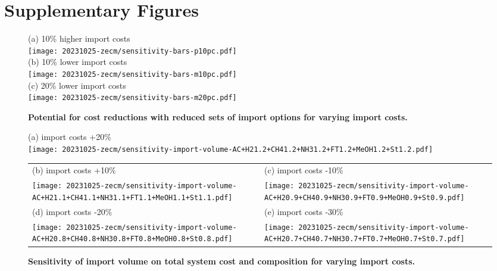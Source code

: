 \section*{Supplementary Figures}
\begin{figure}[!htb]
    \footnotesize
    (a) 10\% higher import costs \\
    \texttt{[image: 20231025-zecm/sensitivity-bars-p10pc.pdf]} \\
    (b) 10\% lower import costs \\
    \texttt{[image: 20231025-zecm/sensitivity-bars-m10pc.pdf]} \\
    (c) 20\% lower import costs \\
    \texttt{[image: 20231025-zecm/sensitivity-bars-m20pc.pdf]} \\
    \caption{\textbf{Potential for cost reductions with reduced sets of import options for varying import costs.}}
    \label{fig:si:subsets}
\end{figure}

\begin{figure*}
    \small
    (a) import costs +20\% \\
    \texttt{[image: 20231025-zecm/sensitivity-import-volume-AC+H21.2+CH41.2+NH31.2+FT1.2+MeOH1.2+St1.2.pdf]}
    \begin{tabular}{ll}
        (b) import costs +10\% & (c) import costs -10\% \\
        \texttt{[image: 20231025-zecm/sensitivity-import-volume-AC+H21.1+CH41.1+NH31.1+FT1.1+MeOH1.1+St1.1.pdf]} &
        \texttt{[image: 20231025-zecm/sensitivity-import-volume-AC+H20.9+CH40.9+NH30.9+FT0.9+MeOH0.9+St0.9.pdf]} \\
        (d) import costs -20\% & (e) import costs -30\% \\
        \texttt{[image: 20231025-zecm/sensitivity-import-volume-AC+H20.8+CH40.8+NH30.8+FT0.8+MeOH0.8+St0.8.pdf]} &
        \texttt{[image: 20231025-zecm/sensitivity-import-volume-AC+H20.7+CH40.7+NH30.7+FT0.7+MeOH0.7+St0.7.pdf]}
    \end{tabular}
    \caption{\textbf{Sensitivity of import volume on total system cost and composition for varying import costs.}}
    \label{fig:si:volume}
\end{figure*}


